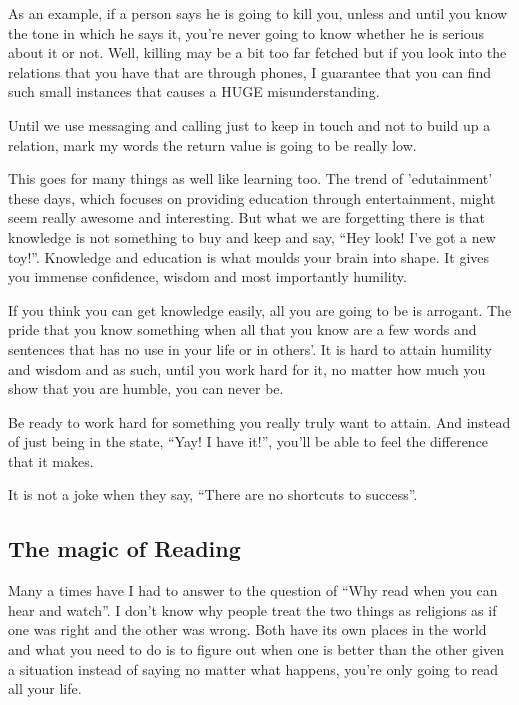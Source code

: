 \documentclass[twoside,11pt]{article}
\begin{document}
As an example, if a person says he is going to kill you, unless and until you know the tone in which he says it, you're never going to know whether he is serious about it or not. Well, killing may be a bit too far fetched but if you look into the relations that you have that are through phones, I guarantee that you can find such small instances that causes a HUGE misunderstanding.

Until we use messaging and calling just to keep in touch and not to build up a relation, mark my words the return value is going to be really low.

This goes for many things as well like learning too. The trend of 'edutainment' these days, which focuses on providing education through entertainment, might seem really awesome and interesting. But what we are forgetting there is that knowledge is not something to buy and keep and say, ``Hey look! I've got a new toy!''. Knowledge and education is what moulds your brain into shape. It gives you immense confidence, wisdom and most importantly humility.

If you think you can get knowledge easily, all you are going to be is arrogant. The pride that you know something when all that you know are a few words and sentences that has no use in your life or in others'. It is hard to attain humility and wisdom and as such, until you work hard for it, no matter how much you show that you are humble, you can never be.

Be ready to work hard for something you really truly want to attain. And instead of just being in the state, ``Yay! I have it!'', you'll be able to feel the difference that it makes.

It is not a joke when they say, ``There are no shortcuts to success''.

\newpage
\begin{center}
  \section{The magic of Reading}
\end{center}
\bigskip
\bigskip
\bigskip

Many a times have I had to answer to the question of ``Why read when you can hear and watch''. I don't know why people treat the two things as religions as if one was right and the other was wrong. Both have its own places in the world and what you need to do is to figure out when one is better than the other given a situation instead of saying no matter what happens, you're only going to read all your life.
\end{document}

